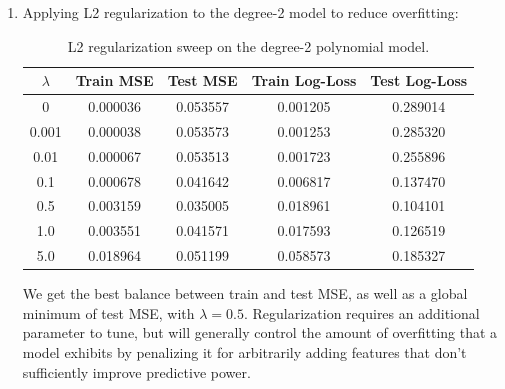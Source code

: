 \documentclass{article} %
\begin{document}
\begin{enumerate}
  \item Applying L2 regularization to the degree-2 model to reduce overfitting:
    \begin{table}[H]
      \centering
      \begin{tabular}{c c c c c}
        \hline
        $\lambda$ & Train MSE & Test MSE & Train Log-Loss & Test Log-Loss \\
        \hline
        0     & 0.000036 & 0.053557 & 0.001205 & 0.289014 \\
        0.001 & 0.000038 & 0.053573 & 0.001253 & 0.285320 \\
        0.01  & 0.000067 & 0.053513 & 0.001723 & 0.255896 \\
        0.1   & 0.000678 & 0.041642 & 0.006817 & 0.137470 \\
        0.5   & 0.003159 & 0.035005 & 0.018961 & 0.104101 \\
        1.0   & 0.003551 & 0.041571 & 0.017593 & 0.126519 \\
        5.0   & 0.018964 & 0.051199 & 0.058573 & 0.185327 \\
        \hline
      \end{tabular}
      \caption{L2 regularization sweep on the degree-2 polynomial model.}
    \end{table}
    We get the best balance between train and test MSE, as well as a
    global minimum of test MSE, with $\lambda =0.5$. Regularization
    requires an additional parameter to tune, but will generally
    control the amount of overfitting that a model exhibits by
    penalizing it for arbitrarily adding features that don't
    sufficiently improve predictive power.

\end{enumerate}
\end{document}
